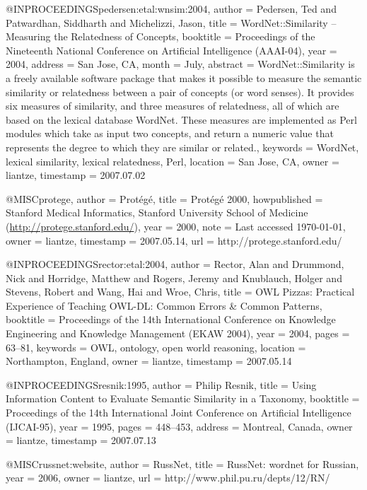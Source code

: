 @INPROCEEDINGS{pedersen:etal:wnsim:2004,
  author = {Pedersen, Ted and Patwardhan, Siddharth and Michelizzi, Jason},
  title = {{WordNet::Similarity} -- Measuring the Relatedness of Concepts},
  booktitle = {Proceedings of the Nineteenth National Conference on Artificial Intelligence
	(AAAI-04)},
  year = {2004},
  address = {San Jose, CA},
  month = {July},
  abstract = {WordNet::Similarity is a freely available software package that makes
	it possible to measure the semantic similarity or relatedness between
	a pair of concepts (or word senses). It provides six measures of
	similarity, and three measures of relatedness, all of which are based
	on the lexical database WordNet. These measures are implemented as
	Perl modules which take as input two concepts, and return a numeric
	value that represents the degree to which they are similar or related.},
  keywords = {WordNet, lexical similarity, lexical relatedness, Perl},
  location = {San Jose, CA},
  owner = {liantze},
  timestamp = {2007.07.02}
}

@MISC{protege,
  author = {Prot\'eg\'e},
  title = {Prot\'eg\'e 2000},
  howpublished = {Stanford Medical Informatics, Stanford University School of Medicine
	(\url{http://protege.stanford.edu/})},
  year = {2000},
  note = {Last accessed \today},
  owner = {liantze},
  timestamp = {2007.05.14},
  url = {http://protege.stanford.edu/}
}

@INPROCEEDINGS{rector:etal:2004,
  author = {Rector, Alan and Drummond, Nick and Horridge, Matthew and Rogers,
	Jeremy and Knublauch, Holger and Stevens, Robert and Wang, Hai and
	Wroe, Chris},
  title = {{OWL} Pizzas: Practical Experience of Teaching {OWL-DL}: Common Errors
	\& Common Patterns},
  booktitle = {Proceedings of the 14th International Conference on Knowledge Engineering
	and Knowledge Management (EKAW 2004)},
  year = {2004},
  pages = {63--81},
  keywords = {OWL, ontology, open world reasoning},
  location = {Northampton, England},
  owner = {liantze},
  timestamp = {2007.05.14}
}

@INPROCEEDINGS{resnik:1995,
  author = {Philip Resnik},
  title = {Using Information Content to Evaluate Semantic Similarity in a Taxonomy},
  booktitle = {Proceedings of the 14th International Joint Conference on Artificial
	Intelligence (IJCAI-95)},
  year = {1995},
  pages = {448--453},
  address = {Montreal, Canada},
  owner = {liantze},
  timestamp = {2007.07.13}
}

@MISC{russnet:website,
  author = {RussNet},
  title = {{RussNet}: wordnet for {Russian}},
  year = {2006},
  owner = {liantze},
  url = {http://www.phil.pu.ru/depts/12/RN/}
}

